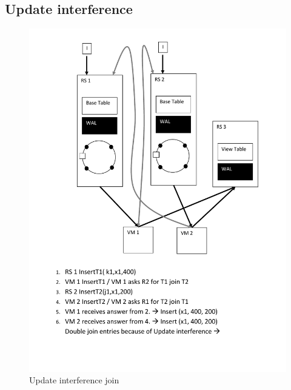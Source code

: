 \subsection{Update interference}
\begin{figure}[h!]
  \centering
    \includegraphics[scale=0.8]{figures/CO_UpdateInterferenceJoin}
     \caption{Update interference join}
    \label{fig:co_updateinterferencejoin}
\end{figure}
\newpage
